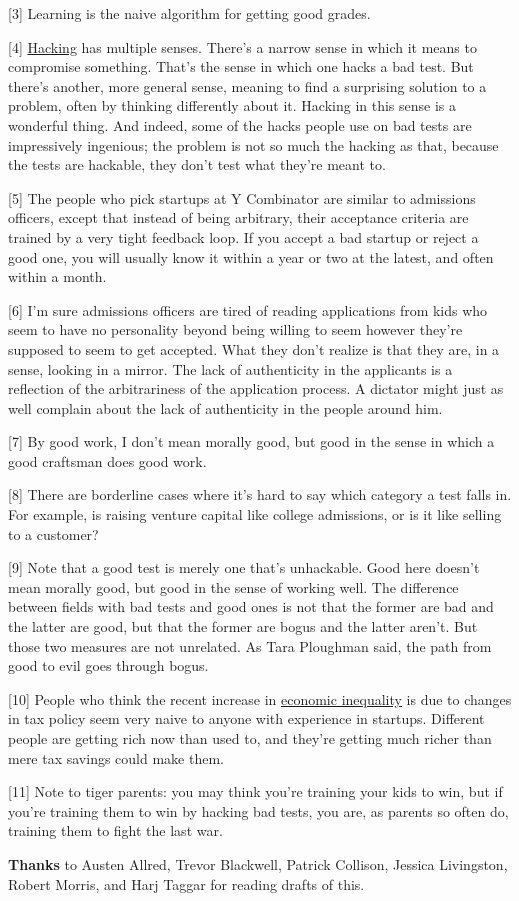 {[}3{]} Learning is the naive algorithm for getting good grades.

{[}4{]} \href{gba.html}{Hacking} has multiple senses. There's a narrow
sense in which it means to compromise something. That's the sense in
which one hacks a bad test. But there's another, more general sense,
meaning to find a surprising solution to a problem, often by thinking
differently about it. Hacking in this sense is a wonderful thing. And
indeed, some of the hacks people use on bad tests are impressively
ingenious; the problem is not so much the hacking as that, because the
tests are hackable, they don't test what they're meant to.

{[}5{]} The people who pick startups at Y Combinator are similar to
admissions officers, except that instead of being arbitrary, their
acceptance criteria are trained by a very tight feedback loop. If you
accept a bad startup or reject a good one, you will usually know it
within a year or two at the latest, and often within a month.

{[}6{]} I'm sure admissions officers are tired of reading applications
from kids who seem to have no personality beyond being willing to seem
however they're supposed to seem to get accepted. What they don't
realize is that they are, in a sense, looking in a mirror. The lack of
authenticity in the applicants is a reflection of the arbitrariness of
the application process. A dictator might just as well complain about
the lack of authenticity in the people around him.

{[}7{]} By good work, I don't mean morally good, but good in the sense
in which a good craftsman does good work.

{[}8{]} There are borderline cases where it's hard to say which category
a test falls in. For example, is raising venture capital like college
admissions, or is it like selling to a customer?

{[}9{]} Note that a good test is merely one that's unhackable. Good here
doesn't mean morally good, but good in the sense of working well. The
difference between fields with bad tests and good ones is not that the
former are bad and the latter are good, but that the former are bogus
and the latter aren't. But those two measures are not unrelated. As Tara
Ploughman said, the path from good to evil goes through bogus.

{[}10{]} People who think the recent increase in
\href{ineq.html}{economic inequality} is due to changes in tax policy
seem very naive to anyone with experience in startups. Different people
are getting rich now than used to, and they're getting much richer than
mere tax savings could make them.

{[}11{]} Note to tiger parents: you may think you're training your kids
to win, but if you're training them to win by hacking bad tests, you
are, as parents so often do, training them to fight the last war.

\textbf{Thanks} to Austen Allred, Trevor Blackwell, Patrick Collison,
Jessica Livingston, Robert Morris, and Harj Taggar for reading drafts of
this.
